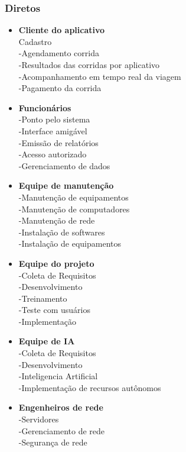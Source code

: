\subsubsection{ Diretos}
\begin{itemize}
      \item \textbf{Cliente do aplicativo}\\
            Cadastro\\
            -Agendamento corrida\\
            -Resultados das corridas por aplicativo\\
            -Acompanhamento em tempo real da viagem\\
            -Pagamento da corrida\\

      \item \textbf{Funcionários}\\
            -Ponto pelo sistema\\
            -Interface amigável\\
            -Emissão de relatórios\\
            -Acesso autorizado\\
            -Gerenciamento de dados\\

      \item \textbf{Equipe de manutenção}\\
            -Manutenção de equipamentos\\
            -Manutenção de computadores\\
            -Manutenção de rede\\
            -Instalação de softwares\\
            -Instalação de equipamentos\\

      \item \textbf{Equipe do projeto}\\
            -Coleta de Requisitos\\
            -Desenvolvimento\\
            -Treinamento\\
            -Teste com usuários\\
            -Implementação\\

      \item \textbf{Equipe de IA}\\
            -Coleta de Requisitos\\
            -Desenvolvimento\\
            -Inteligencia Artificial\\
            -Implementação de recursos autônomos\\


      \item \textbf{Engenheiros de rede}\\
            -Servidores\\
            -Gerenciamento de rede\\
            -Segurança de rede\\

\end{itemize}
